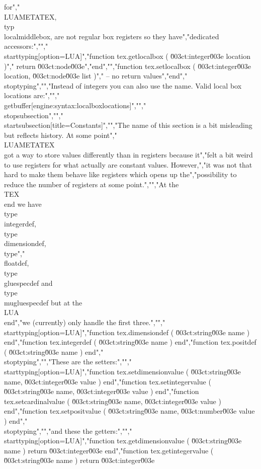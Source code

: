 for","\\LUAMETATEX, \\typ {\\localmiddlebox}, are not regular box registers so they have","dedicated accessors:","","\\starttyping[option=LUA]","function tex.getlocalbox ( \u003ct:integer\u003e location )","    return \u003ct:node\u003e","end","","function tex.setlocalbox ( \u003ct:integer\u003e location, \u003ct:node\u003e list )","    -- no return values","end","\\stoptyping","","Instead of integers you can also use the name. Valid local box locations are:","","\\getbuffer[engine:syntax:localboxlocations]","","\\stopsubsection","","\\startsubsection[title=Constants]","","The name of this section is a bit misleading but reflects history. At some point","\\LUAMETATEX\\ got a way to store values differently than in registers because it","felt a bit weird to use registers for what actually are constant values. However,","it was not that hard to make them behave like registers which opens up the","possibility to reduce the number of registers at some point.","","At the \\TEX\\ end we have \\type {\\integerdef}, \\type {\\dimensiondef}, \\type","{\\floatdef}, \\type {\\gluespecdef} and \\type {\\mugluespecdef} but at the \\LUA\\ end","we (currently) only handle the first three.","","\\starttyping[option=LUA]","function tex.dimensiondef ( \u003ct:string\u003e name ) end","function tex.integerdef   ( \u003ct:string\u003e name ) end","function tex.positdef     ( \u003ct:string\u003e name ) end","\\stoptyping","","These are the setters:","","\\starttyping[option=LUA]","function tex.setdimensionvalue ( \u003ct:string\u003e name, \u003ct:integer\u003e value ) end","function tex.setintegervalue   ( \u003ct:string\u003e name, \u003ct:integer\u003e value ) end","function tex.setcardinalvalue  ( \u003ct:string\u003e name, \u003ct:integer\u003e value ) end","function tex.setpositvalue     ( \u003ct:string\u003e name, \u003ct:number\u003e  value ) end","\\stoptyping","","and these the getters:","","\\starttyping[option=LUA]","function tex.getdimensionvalue ( \u003ct:string\u003e name ) return \u003ct:integer\u003e end","function tex.getintegervalue   ( \u003ct:string\u003e name ) return \u003ct:integer\u003e 